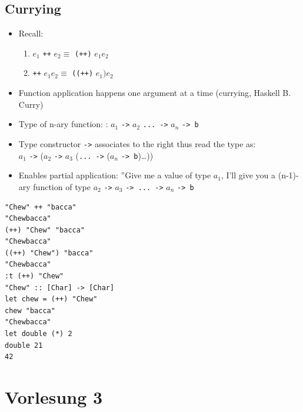 \documentclass{article}
\newcommand{\Haskell}[1]{\texttt{#1}}
\begin{document}
\subsection{Currying}
\begin{itemize}
\item Recall:\begin{enumerate}
\item $e_1$ \Haskell{++} $e_2 \equiv$ \Haskell{(++)} $e_1 e_2$
\item \Haskell{++} $e_1 e_2 \equiv$ \Haskell{((++)} $e_1) e_2$
\end{enumerate}
\item Function application happens one argument at a time (currying, Haskell B. Curry)
\item Type of n-ary function: : $a_1$ \Haskell{->} $a_2$ \Haskell{... ->} $a_n$ \Haskell{-> b}
\item Type constructor \Haskell{->} associates to the right thus read the type as:\\ $a_1$ \Haskell{->} ($a_2$ \Haskell{->} $a_3$ (\Haskell{... ->} ($a_n$ \Haskell{-> b})\ldots))
\item Enables partial application: ''Give me a value of type $a_1$, I'll give you a (n-1)-ary function of type $a_2$ \Haskell{->} $a_3$ \Haskell{-> ... ->} $a_n$ \Haskell{-> b}
\end{itemize}
\begin{verbatim}
"Chew" ++ "bacca"
"Chewbacca"
(++) "Chew" "bacca"
"Chewbacca"
((++) "Chew") "bacca"
"Chewbacca"
:t (++) "Chew"
"Chew" :: [Char] -> [Char]
let chew = (++) "Chew"
chew "bacca"
"Chewbacca"
let double (*) 2
double 21
42
\end{verbatim}
\section{Vorlesung 3}
\end{document}
